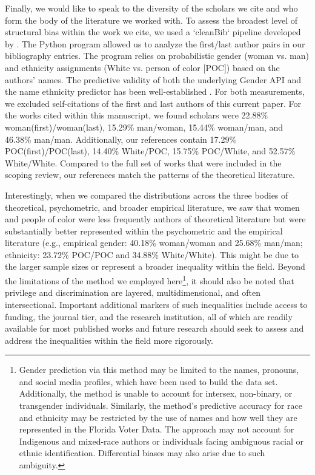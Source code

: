 \documentclass[man, 12pt, a4paper, mask]{apa7}
\begin{document}
Finally, we would like to speak to the diversity of the scholars we cite and who form the body of the literature we worked with. To assess the broadest level of structural bias within the work we cite, we used a `cleanBib` pipeline developed by \citet{zhou2022}. The Python program allowed us to analyze the first/last author pairs in our bibliography entries. The program relies on probabilistic gender (woman vs. man) and ethnicity assignments (White vs. person of color [POC]) based on the authors' names. The predictive validity of both the underlying Gender API \citep[][]{sebo2021} and the name ethnicity predictor has been well-established \citep[][]{ambekar2009, sood2018}. For both measurements, we excluded self-citations of the first and last authors of this current paper. For the works cited within this manuscript, we found scholars were 22.88\% woman(first)/woman(last), 15.29\% man/woman, 15.44\% woman/man, and 46.38\% man/man. Additionally, our references contain 17.29\% POC(first)/POC(last), 14.40\% White/POC, 15.75\% POC/White, and 52.57\% White/White. Compared to the full set of works that were included in the scoping review, our references match the patterns of the theoretical literature. 

Interestingly, when we compared the distributions across the three bodies of theoretical, psychometric, and broader empirical literature, we saw that women and people of color were less frequently authors of theoretical literature but were substantially better represented within the psychometric and the empirical literature (e.g., empirical gender: 40.18\% woman/woman and 25.68\% man/man; ethnicity: 23.72\% POC/POC and 34.88\% White/White). This might be due to the larger sample sizes or represent a broader inequality within the field. Beyond the limitations of the method we employed here\footnote{Gender prediction via this method may be limited to the names, pronouns, and social media profiles, which have been used to build the data set. Additionally, the method is unable to account for intersex, non-binary, or transgender individuals. Similarly, the method's predictive accuracy for race and ethnicity may be restricted by the use of names and how well they are represented in the Florida Voter Data. The approach may not account for Indigenous and mixed-race authors or individuals facing ambiguous racial or ethnic identification. Differential biases may also arise due to such ambiguity.}, it should also be noted that privilege and discrimination are layered, multidimensional, and often intersectional. Important additional markers of such inequalities include access to funding, the journal tier, and the research institution, all of which are readily available for most published works and future research should seek to assess and address the inequalities within the field more rigorously. 
\end{document}

